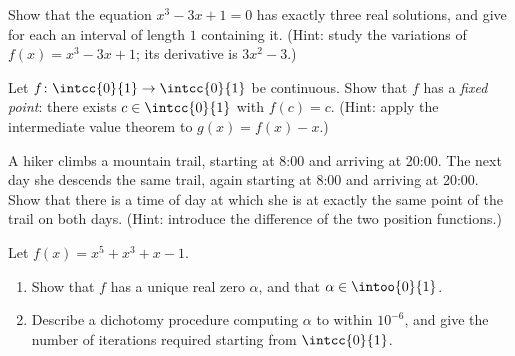 \begin{exercise}[$\star\star$]\label{exo:tle:limcont:6}
Show that the equation $x^3 - 3x + 1 = 0$ has exactly three real solutions,
and give for each an interval of length $1$ containing it.
(Hint: study the variations of $f(x) = x^3 - 3x + 1$; its derivative is
$3x^2 - 3$.)
\end{exercise}

\begin{exercise}[$\star\star$]\label{exo:tle:limcont:7}
Let $f \colon \intcc{0}{1} \to \intcc{0}{1}$ be continuous. Show that $f$ has
a \emph{fixed point}: there exists $c \in \intcc{0}{1}$ with $f(c) = c$.
(Hint: apply the intermediate value theorem to $g(x) = f(x) - x$.)
\end{exercise}

\begin{exercise}[$\star\star\star$]\label{exo:tle:limcont:8}
A hiker climbs a mountain trail, starting at 8:00 and arriving at 20:00. The
next day she descends the same trail, again starting at 8:00 and arriving at
20:00. Show that there is a time of day at which she is at exactly the same
point of the trail on both days. (Hint: introduce the difference of the two
position functions.)
\end{exercise}

\begin{exercise}[$\star\star\star$]\label{exo:tle:limcont:9}
Let $f(x) = x^5 + x^3 + x - 1$.
\begin{enumerate}
  \item Show that $f$ has a unique real zero $\alpha$, and that
        $\alpha \in \intoo{0}{1}$.
  \item Describe a dichotomy procedure computing $\alpha$ to within
        $10^{-6}$, and give the number of iterations required starting from
        $\intcc{0}{1}$.
\end{enumerate}
\end{exercise}

